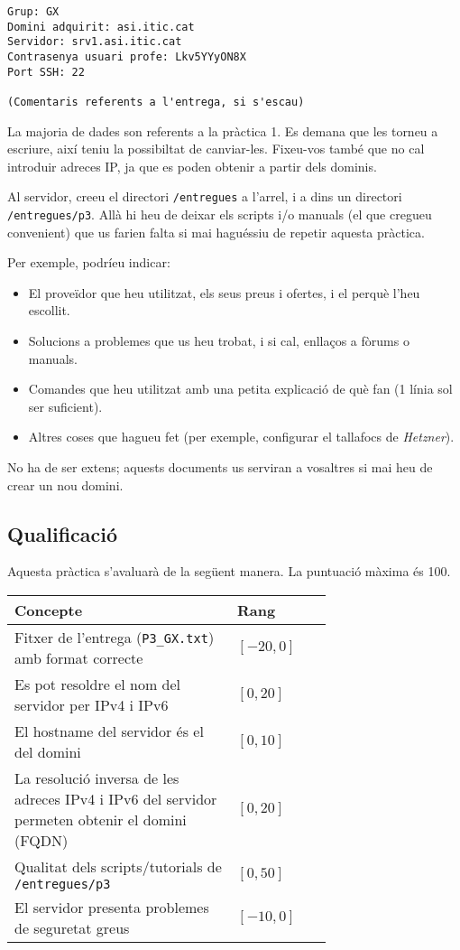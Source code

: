 \documentclass{practicaitic}
\begin{document}
\begin{verbatim}
Grup: GX
Domini adquirit: asi.itic.cat
Servidor: srv1.asi.itic.cat
Contrasenya usuari profe: Lkv5YYyON8X
Port SSH: 22

(Comentaris referents a l'entrega, si s'escau)
\end{verbatim}

La majoria de dades son referents a la pràctica 1. Es demana
que les torneu a escriure, així teniu la possibiltat de canviar-les.
Fixeu-vos també que no cal introduir adreces IP, ja que es poden
obtenir a partir dels dominis.

Al servidor, creeu el directori \texttt{/entregues} a l'arrel, i a dins un
directori \texttt{/entregues/p3}. Allà hi heu de deixar els scripts i/o manuals
(el que cregueu convenient) que us farien falta si mai haguéssiu de repetir
aquesta pràctica.

Per exemple, podríeu indicar:
\begin{itemize}
  \item El proveïdor que heu utilitzat, els seus preus i ofertes, i el perquè l'heu escollit.
  \item Solucions a problemes que us heu trobat, i si cal, enllaços a fòrums o manuals.
  \item Comandes que heu utilitzat amb una petita explicació de què fan (1 línia sol ser suficient).
  \item Altres coses que hagueu fet (per exemple, configurar el tallafocs de \textit{Hetzner}).
\end{itemize}

No ha de ser extens; aquests documents us serviran a vosaltres si mai heu de
crear un nou domini.

\subsection{Qualificació}

Aquesta pràctica s'avaluarà de la següent manera. La puntuació màxima és 100.

\begin{center}%
  \begin{tabular}{p{0.7\linewidth} l}
  \hline
  Concepte & Rang \\ \hline
  Fitxer de l'entrega (\texttt{P3\_GX.txt}) amb format correcte & $[-20, 0]$ \\
  Es pot resoldre el nom del servidor per IPv4 i IPv6 & $[0, 20]$ \\
  El hostname del servidor és el del domini & $[0, 10]$ \\
  La resolució inversa de les adreces IPv4 i IPv6 del servidor permeten obtenir el domini (FQDN) & $[0, 20]$ \\
  Qualitat dels scripts/tutorials de \texttt{/entregues/p3} & $[0,50]$ \\
  El servidor presenta problemes de seguretat greus & $[-10,0]$ \\
  \hline
  \end{tabular}
\end{center}
\end{document}
